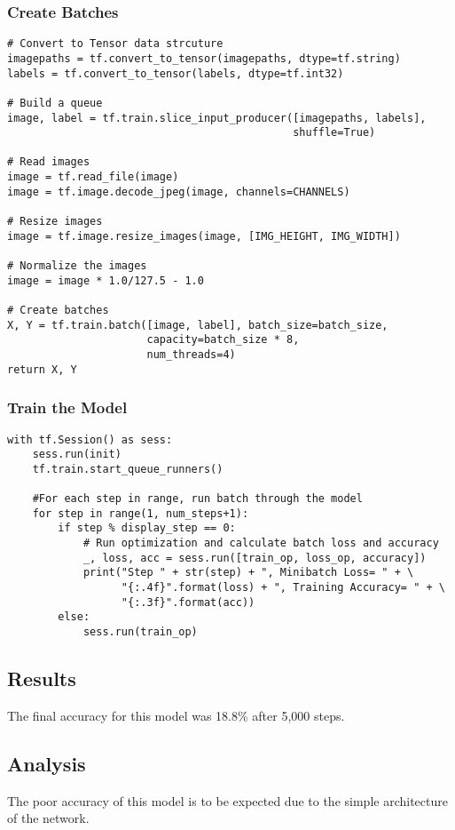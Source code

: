 \tocless\subsubsection{Create Batches}
\begin{lstlisting}[style=Python]
# Convert to Tensor data strcuture
imagepaths = tf.convert_to_tensor(imagepaths, dtype=tf.string)
labels = tf.convert_to_tensor(labels, dtype=tf.int32)

# Build a queue
image, label = tf.train.slice_input_producer([imagepaths, labels],
                                             shuffle=True)

# Read images
image = tf.read_file(image)
image = tf.image.decode_jpeg(image, channels=CHANNELS)

# Resize images
image = tf.image.resize_images(image, [IMG_HEIGHT, IMG_WIDTH])

# Normalize the images
image = image * 1.0/127.5 - 1.0

# Create batches
X, Y = tf.train.batch([image, label], batch_size=batch_size,
                      capacity=batch_size * 8,
                      num_threads=4)
return X, Y
\end{lstlisting}

\tocless\subsubsection{Train the Model}
\begin{lstlisting}[style=Python]
with tf.Session() as sess:
    sess.run(init)
    tf.train.start_queue_runners()

    #For each step in range, run batch through the model
    for step in range(1, num_steps+1):
        if step % display_step == 0:
            # Run optimization and calculate batch loss and accuracy
            _, loss, acc = sess.run([train_op, loss_op, accuracy])
            print("Step " + str(step) + ", Minibatch Loss= " + \
                  "{:.4f}".format(loss) + ", Training Accuracy= " + \
                  "{:.3f}".format(acc))
        else:
            sess.run(train_op)
\end{lstlisting}

\tocless\subsection{Results}
The final accuracy for this model was 18.8\% after 5,000 steps.

\tocless\subsection{Analysis}
The poor accuracy of this model is to be expected due to the simple architecture of the network.